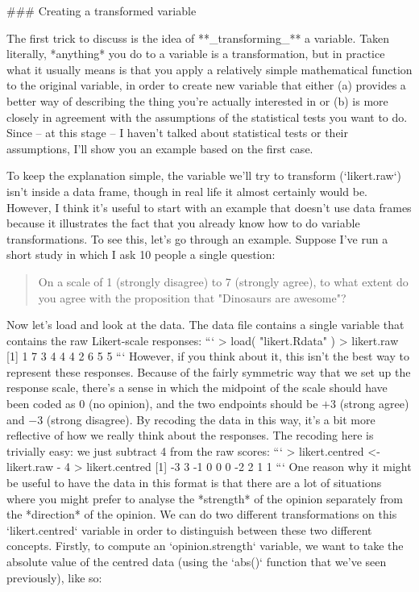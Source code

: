 ### Creating a transformed variable

The first trick to discuss is the idea of **_transforming_** a variable. Taken literally, *anything* you do to a variable is a transformation, but in practice what it usually means is that you apply a relatively simple mathematical function to the original variable, in order to create new variable that either (a) provides a better way of describing the thing you're actually interested in or (b) is more closely in agreement with the assumptions of the statistical tests you want to do.  Since -- at this stage -- I haven't talked about statistical tests or their assumptions, I'll show you an example based on the first case. 

To keep the explanation simple, the variable we'll try to transform (`likert.raw`) isn't inside a data frame, though in real life it almost certainly would be. However, I think it's useful to start with an example that doesn't use data frames because it illustrates the fact that you already know how to do variable transformations. To see this, let's go through an example. Suppose I've run a short study in which I ask 10 people a single question: 
\begin{quote}
On a scale of 1 (strongly disagree) to 7 (strongly agree), to what extent do you agree with the proposition that "Dinosaurs are awesome"?
\end{quote}
Now let's load and look at the data. The data file  contains a single variable that contains the raw Likert-scale responses:
```
> load( "likert.Rdata" )
> likert.raw
 [1] 1 7 3 4 4 4 2 6 5 5
```
However, if you think about it, this isn't the best way to represent these responses.   Because of the fairly symmetric way that we set up the response scale, there's a sense in which the midpoint of the scale should have been coded as 0 (no opinion), and the two endpoints should be $+3$ (strong agree) and $-3$ (strong disagree). By recoding the data in this way, it's a bit more reflective of how we really think about the responses. The recoding here is trivially easy: we just subtract 4 from the raw scores:
```
> likert.centred <- likert.raw - 4
> likert.centred
 [1] -3  3 -1  0  0  0 -2  2  1  1
```
One reason why it might be useful to have the data in this format is that there are a lot of situations where you might prefer to analyse the *strength* of the opinion separately from the *direction* of the opinion. We can do two different transformations on this `likert.centred` variable in order to distinguish between these two different concepts. Firstly, to compute an `opinion.strength` variable, we want to take the absolute value of the centred data (using the `abs()` function that we've seen previously), like so:
